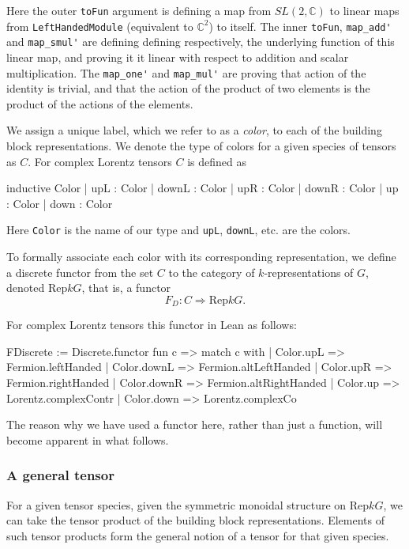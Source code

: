 \documentclass[a4paper, 11pt]{article}
\begin{document}
Here the  outer \lstinline|toFun| argument is defining a map from $SL(2,\mathbb{C})$ to linear maps 
from \lstinline|LeftHandedModule| (equivalent to $\mathbb{C}^2$) to itself. The inner \lstinline|toFun|, 
\lstinline|map_add'| and \lstinline|map_smul'| are defining defining respectively, the underlying 
function of this linear map, and proving it it linear with respect to addition and scalar multiplication.
The \lstinline|map_one'| and \lstinline|map_mul'| are proving that action of the identity is trivial, 
and that the action of the product of two elements is the product of the actions of the elements.

We assign a unique label, which we refer to as a \emph{color}, to each of the 
building block representations. We denote the type of colors for a given species of tensors as $C$.
For complex Lorentz tensors 
$C$ is defined as 
\begin{code}
inductive Color
  | upL : Color
  | downL : Color
  | upR : Color
  | downR : Color
  | up : Color
  | down : Color
\end{code}
Here \lstinline|Color| is the name of our type and \lstinline|upL|, \lstinline|downL|, etc. are the
colors. 

To formally associate each color with its corresponding representation, we define
a discrete functor from the set $C$ to the category of $k$-representations of $G$, denoted 
$\mathrm{Rep} k G$, that is, a functor
\begin{equation} 
  F_{D} : C \Rightarrow \mathrm{Rep} k G.
\end{equation}


For complex Lorentz tensors this functor in Lean as follows:
\begin{code}
FDiscrete := Discrete.functor fun c =>
  match c with
  | Color.upL => Fermion.leftHanded
  | Color.downL => Fermion.altLeftHanded
  | Color.upR => Fermion.rightHanded
  | Color.downR => Fermion.altRightHanded
  | Color.up => Lorentz.complexContr
  | Color.down => Lorentz.complexCo
\end{code}

The reason why we have used a functor here, rather than just a function, will become apparent
in what follows.


\subsubsection{A general tensor}

For a given tensor species, given the symmetric monoidal structure on $\mathrm{Rep} k G$, 
we can take the tensor product of the building block representations. 
Elements of such tensor products form the general notion of a tensor for that given 
species. 
\end{document}
